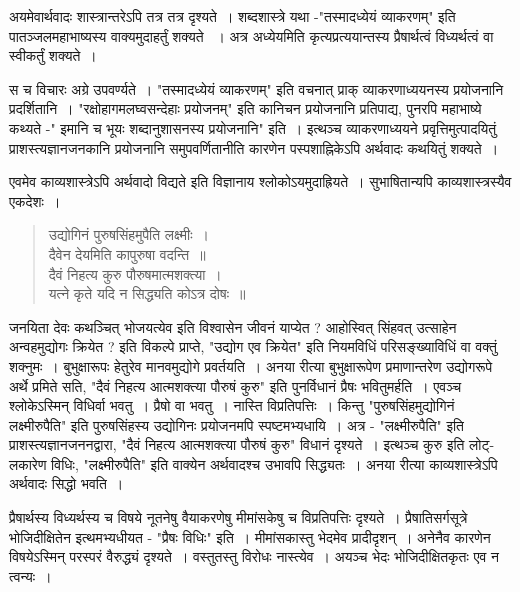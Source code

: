 {अयमेवार्थवादः शास्त्रान्तरेऽपि तत्र तत्र दृश्यते~। शब्दशास्त्रे यथा  -"तस्मादध्येयं व्याकरणम्" इति पातञ्जलमहाभाष्यस्य वाक्यमुदाहर्तुं शक्यते ~। अत्र अध्येयमिति कृत्यप्रत्ययान्तस्य प्रैषार्थत्वं विध्यर्थत्वं वा स्वीकर्तुं शक्यते~। 

स च विचारः अग्रे उपवर्ण्यते~। "तस्मादध्येयं व्याकरणम्" इति वचनात् प्राक् व्याकरणाध्ययनस्य प्रयोजनानि प्रदर्शितानि~। "रक्षोहागमलघ्वसन्देहाः प्रयोजनम्" इति कानिचन प्रयोजनानि प्रतिपाद्य, पुनरपि महाभाष्ये कथ्यते -" इमानि च भूयः शब्दानुशासनस्य प्रयोजनानि" इति~। इत्थञ्च व्याकरणाध्ययने प्रवृत्तिमुत्पादयितुं प्राशस्त्यज्ञानजनकानि प्रयोजनानि समुपवर्णितानीति कारणेन पस्पशाह्निकेऽपि अर्थवादः कथयितुं शक्यते~। 

एवमेव काव्यशास्त्रेऽपि अर्थवादो विद्यते इति विज्ञानाय श्लोकोऽयमुदाह्रियते~। सुभाषितान्यपि काव्यशास्त्रस्यैव एकदेशः~। 
\begin{verse}
उद्योगिनं पुरुषसिंहमुपैति लक्ष्मीः~। \\
दैवेन देयमिति कापुरुषा वदन्ति~॥\\
दैवं निहत्य कुरु पौरुषमात्मशक्त्या~। \\
यत्ने कृते यदि न सिद्ध्यति कोऽत्र दोषः~॥
\end{verse}
जनयिता देवः कथञ्चित् भोजयत्येव इति विश्वासेन जीवनं याप्येत ? आहोस्वित्  सिंहवत् उत्साहेन अन्वहमुद्योगः क्रियेत ? इति विकल्पे प्राप्ते, "उद्योग एव क्रियेत" इति नियमविधिं परिसङ्ख्याविधिं वा वक्तुं शक्नुमः~। बुभुक्षारूपः हेतुरेव मानवमुद्योगे प्रवर्तयति~। अनया रीत्या बुभुक्षारूपेण प्रमाणान्तरेण उद्योगरूपे अर्थे प्रमिते सति, "दैवं निहत्य आत्मशक्त्या पौरुषं कुरु" इति पुनर्विधानं प्रैषः भवितुमर्हति~। एवञ्च श्लोकेऽस्मिन् विधिर्वा भवतु~। प्रैषो वा भवतु~। नास्ति विप्रतिपत्तिः~। किन्तु "पुरुषसिंहमुद्योगिनं लक्ष्मीरुपैति" इति पुरुषसिंहस्य उद्योगिनः प्रयोजनमपि स्पष्टमभ्यधायि~। अत्र - "लक्ष्मीरुपैति" इति प्राशस्त्यज्ञानजननद्वारा, "दैवं निहत्य आत्मशक्त्या पौरुषं कुरु" विधानं दृश्यते~। इत्थञ्च कुरु इति लोट्-लकारेण विधिः, "लक्ष्मीरुपैति" इति वाक्येन अर्थवादश्च उभावपि सिद्ध्यतः~। अनया रीत्या काव्यशास्त्रेऽपि अर्थवादः सिद्धो भवति~। 

प्रैषार्थस्य विध्यर्थस्य च विषये नूतनेषु वैयाकरणेषु मीमांसकेषु च विप्रतिपत्तिः दृश्यते~। प्रैषातिसर्गसूत्रे भोजिदीक्षितेन इत्थमभ्यधीयत - "प्रैषः विधिः" इति~। मीमांसकास्तु भेदमेव प्रादीदृशन्~। अनेनैव कारणेन विषयेऽस्मिन् परस्परं वैरुद्ध्यं दृश्यते~। वस्तुतस्तु विरोधः नास्त्येव~। अयञ्च भेदः भोजिदीक्षितकृतः एव न त्वन्यः~। 

}
